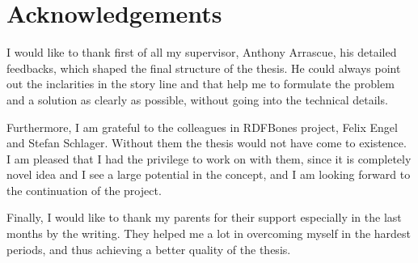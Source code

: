 \newpage
\chapter*{Acknowledgements}

I would like to thank first of all my supervisor, Anthony Arrascue, his detailed feedbacks, which shaped the final structure of the thesis. He could always point out the inclarities in the story line and that help me to formulate the problem and a solution as clearly as possible, without going into the technical details.

Furthermore, I am grateful to the colleagues in RDFBones project, Felix Engel and Stefan Schlager. Without them the thesis would not have come to existence. I am pleased that I had the privilege to work on with them, since it is completely novel idea and I see a large potential in the concept, and I am looking forward to the continuation of the project. 


Finally, I would like to thank my parents for their support especially in the last months by the writing. They helped me a lot in overcoming myself in the hardest periods, and thus achieving a better quality of the thesis.



